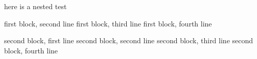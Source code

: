 here is a nested test
\begin{one}
		first block, second line
		first block, third line
		first block, fourth line
	\begin{two}
		second block, first line
		second block, second line
		second block, third line
		second block, fourth line
\end{two}
\end{one}
